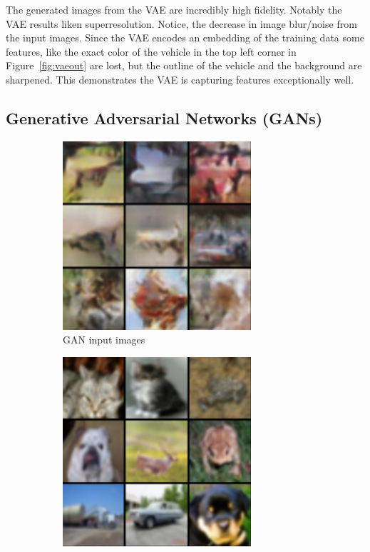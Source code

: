 \documentclass[%
 reprint,
 amsmath,amssymb,
 aps,
]{revtex4-2}
\begin{document}
The generated images from the VAE are incredibly high fidelity. Notably the VAE results liken superresolution. Notice, the decrease in image blur/noise from the input images. Since the VAE encodes an embedding of the training data some features, like the exact color of the vehicle in the top left corner in Figure~\ref{fig:vaeout} are lost, but the outline of the vehicle and the background are sharpened. This demonstrates the VAE is capturing features exceptionally well.

\subsection{Generative Adversarial Networks (GANs)}

\begin{figure}[h]
    \begin{subfigure}{\columnwidth}
        \centering
        \includegraphics[width=.8\linewidth]{ganin.png}
        \caption{GAN input images}
        \label{fig:ganin}
    \end{subfigure}
    \hfill
    \begin{subfigure}{\columnwidth}
        \centering
        \includegraphics[width=.8\linewidth]{ganout.png}

\end{subfigure}
\end{figure}
\end{document}
